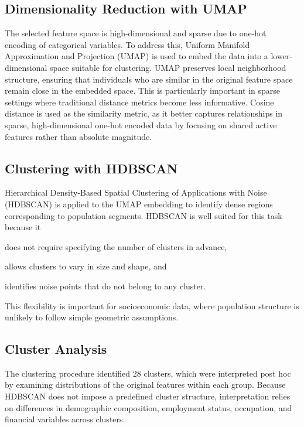 \subsection{Dimensionality Reduction with UMAP}

The selected feature space is high-dimensional and sparse due to one-hot encoding of categorical variables. To address this, Uniform Manifold Approximation and Projection (UMAP) is used to embed the data into a lower-dimensional space suitable for clustering. UMAP preserves local neighborhood structure, ensuring that individuals who are similar in the original feature space remain close in the embedded space. This is particularly important in sparse settings where traditional distance metrics become less informative. Cosine distance is used as the similarity metric, as it better captures relationships in sparse, high-dimensional one-hot encoded data by focusing on shared active features rather than absolute magnitude.

\subsection{Clustering with HDBSCAN}

Hierarchical Density-Based Spatial Clustering of Applications with Noise (HDBSCAN) is applied to the UMAP embedding to identify dense regions corresponding to population segments. HDBSCAN is well suited for this task because it
\begin{enumerate*}[label=(\roman*)]
	\item does not require specifying the number of clusters in advance,
	\item allows clusters to vary in size and shape, and 
	\item identifies noise points that do not belong to any cluster.
\end{enumerate*}
This flexibility is important for socioeconomic data, where population structure is unlikely to follow simple geometric assumptions.

\subsection{Cluster Analysis}

The clustering procedure identified 28 clusters, which were interpreted post hoc by examining distributions of the original features within each group. Because HDBSCAN does not impose a predefined cluster structure, interpretation relies on differences in demographic composition, employment status, occupation, and financial variables across clusters.


